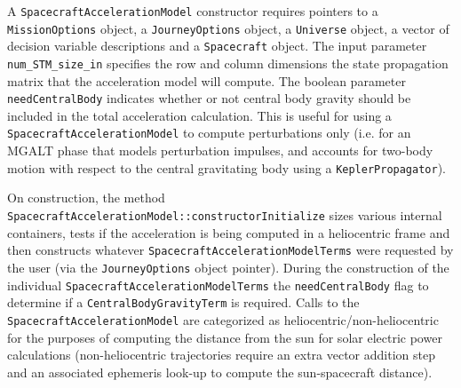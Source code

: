 A \texttt{SpacecraftAccelerationModel} constructor requires pointers to a \texttt{MissionOptions} object, a \texttt{JourneyOptions} object, a \texttt{Universe} object, a vector of decision variable descriptions and a \texttt{Spacecraft} object. The input parameter \texttt{num\_STM\_size\_in} specifies the row and column dimensions the state propagation matrix that the acceleration model will compute. The boolean parameter \texttt{needCentralBody} indicates whether or not central body gravity should be included in the total acceleration calculation. This is useful for using a \texttt{SpacecraftAccelerationModel} to compute perturbations only (i.e. for an MGALT phase that models perturbation impulses, and accounts for two-body motion with respect to the central gravitating body using a \texttt{KeplerPropagator}).

On construction, the method \texttt{SpacecraftAccelerationModel::constructorInitialize} sizes various internal containers, tests if the acceleration is being computed in a heliocentric frame and then constructs whatever \texttt{SpacecraftAccelerationModelTerms} were requested by the user (via the \texttt{JourneyOptions} object pointer). During the construction of the individual \texttt{SpacecraftAccelerationModelTerms} the \texttt{needCentralBody} flag to determine if a \texttt{CentralBodyGravityTerm} is required. Calls to the \texttt{SpacecraftAccelerationModel} are categorized as heliocentric/non-heliocentric for the purposes of computing the distance from the sun for solar electric power calculations (non-heliocentric trajectories require an extra vector addition step and an associated ephemeris look-up to compute the sun-spacecraft distance).

